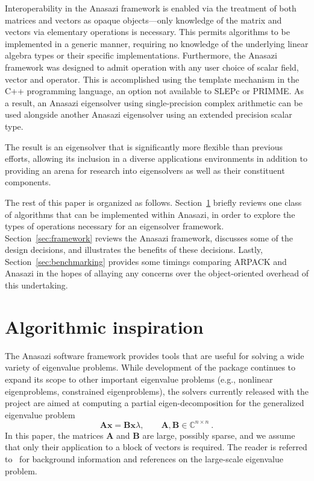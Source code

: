 \documentclass[acmtoms]{acmtrans2m}
\newcounter{algorithm}
\begin{document}
Interoperability in the Anasazi framework is enabled via the treatment of both matrices and 
vectors as opaque objects---only knowledge of the matrix and vectors via elementary operations 
is necessary. This permits algorithms to be implemented in a generic manner, requiring no
knowledge of the underlying linear algebra types or their specific implementations.
Furthermore, the Anasazi framework was designed to admit operation with any user choice
of scalar field, vector and operator. This is accomplished using the template mechanism in
the C++ programming language, an option not available to SLEPc or PRIMME. As a result, an
Anasazi eigensolver using single-precision complex arithmetic can be used alongside
another Anasazi eigensolver using an extended precision scalar type. 

The result is an eigensolver that is significantly more flexible than previous efforts,
allowing its inclusion in a diverse applications environments in addition to providing an
arena for research into eigensolvers as well as their constituent components.

The rest of this paper is organized as follows. Section~\ref{sec:algorithm-overview}
briefly reviews one class of algorithms that can be implemented within Anasazi, in order
to explore the types of operations necessary for an eigensolver framework.
Section~\ref{sec:framework} reviews the Anasazi framework, discusses some of the design
decisions, and illustrates the benefits of these decisions. Lastly,
Section~\ref{sec:benchmarking} provides some timings comparing ARPACK and Anasazi in the
hopes of allaying any concerns over the object-oriented overhead of this undertaking.


\section{Algorithmic inspiration}
\label{sec:algorithm-overview}

The Anasazi software framework provides tools that are useful for solving a wide variety
of eigenvalue problems. While development of the package continues to expand its scope to
other important eigenvalue problems (e.g., nonlinear eigenproblems, constrained
eigenproblems), the solvers currently released with the project are aimed at computing a
partial eigen-decomposition for the generalized eigenvalue problem
\begin{equation}  \label{eq:intro.1}
  \mathbf{A} \mathbf{x} = \mathbf{B} \mathbf{x} \lambda , \qquad
  \mathbf{A}, \mathbf{B} \in \mathbb{C}^{n\times n}\ .
\end{equation}
In this paper, the matrices $\mathbf{A}$ and $\mathbf{B}$ are large, possibly sparse, and
we assume that only their application to a block of vectors is required. The reader is
referred to~\cite{saad:92,sore:02,stew:01book,vors:02} for background information and
references on the large-scale eigenvalue problem.
\end{document}
